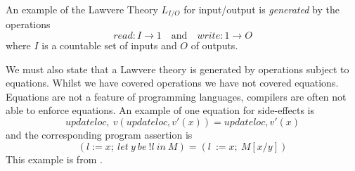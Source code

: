 \begin{example}
    An example of the Lawvere Theory $L_{I/O}$ for input/output
    is \textit{generated} by the operations
    \begin{equation}
        read : I \rightarrow 1 \quad\textrm{and}\quad write : 1 \rightarrow O
    \end{equation}
    where $I$ is a countable set of inputs and $O$ of outputs\cite{plotkin2004computational}.
\end{example}

We must also state that a Lawvere theory is
generated by operations subject to equations.
Whilst we have covered operations we have not covered equations.
Equations are not a feature of programming languages,
compilers are often not able to enforce equations.
An example of one equation for side-effects is
\begin{equation}
    updateloc,\ v (updateloc,v\prime (x)) = updateloc,v\prime (x)
\end{equation}
and the corresponding program assertion is
\begin{equation}
    (l := x;\ let\ y\ be\ !l\ in\ M) = (l\ := x;\ M[x/y])
\end{equation}
This example is from \cite{plotkin2004computational}.
